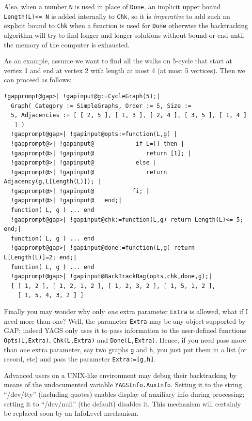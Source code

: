\documentclass[a4paper,11pt]{report}
\begin{document}
{{Also, when a number \texttt{N} is used in place of \texttt{Done}, an implicit upper bound \texttt{Length(L){\textless}= N} is added internally to \texttt{Chk}, so it is \emph{imperative} to add such an explicit bound to \texttt{Chk} when a function is used for \texttt{Done} otherwise the backtracking algorithm will try to find longer and longer
solutions without bound or end until the memory of the computer is exhausted. 

As an example, assume we want to find all the walks on 5-cycle that start at
vertex 1 and end at vertex 2 with length at most 4 (at most 5 vertices). Then
we can proceed as follows: 

 
\begin{Verbatim}[commandchars=!@|,fontsize=\small,frame=single,label=Example]
  !gapprompt@gap>| !gapinput@g:=CycleGraph(5);|
  Graph( Category := SimpleGraphs, Order := 5, Size := 
  5, Adjacencies := [ [ 2, 5 ], [ 1, 3 ], [ 2, 4 ], [ 3, 5 ], [ 1, 4 ] 
   ] )
  !gapprompt@gap>| !gapinput@opts:=function(L,g) |
  !gapprompt@>| !gapinput@            if L=[] then |
  !gapprompt@>| !gapinput@               return [1]; |
  !gapprompt@>| !gapinput@            else |
  !gapprompt@>| !gapinput@               return Adjacency(g,L[Length(L)]); |
  !gapprompt@>| !gapinput@           fi; |
  !gapprompt@>| !gapinput@   end;|
  function( L, g ) ... end
  !gapprompt@gap>| !gapinput@chk:=function(L,g) return Length(L)<= 5; end;|
  function( L, g ) ... end
  !gapprompt@gap>| !gapinput@done:=function(L,g) return L[Length(L)]=2; end;|
  function( L, g ) ... end
  !gapprompt@gap>| !gapinput@BackTrackBag(opts,chk,done,g);|
  [ [ 1, 2 ], [ 1, 2, 1, 2 ], [ 1, 2, 3, 2 ], [ 1, 5, 1, 2 ], 
    [ 1, 5, 4, 3, 2 ] ]
\end{Verbatim}
 

Finally you may wonder why only \emph{one} extra parameter \texttt{Extra} is allowed, what if I need more than one? Well, the parameter \texttt{Extra} may be any object supported by \textsf{GAP}; indeed \textsf{YAGS} only uses it to pass information to the user-defined functions \texttt{Opts(L,Extra)}, \texttt{Chk(L,Extra)} and \texttt{Done(L,Extra)}. Hence, if you need pass more than one extra parameter, say two graphs \texttt{g} and \texttt{h}, you just put them in a list (or record, etc) and pass the parameter \texttt{Extra:=[g,h]}. 

Advanced users on a UNIX-like environment may debug their backtracking by
means of the undocumented variable \texttt{YAGSInfo.AuxInfo}. Setting it to the string ``/dev/tty'' (including quotes) enables display of auxiliary info during processing;
setting it to ``/dev/null'' (the default) disables it. This mechanism will certainly be replaced soon by
an InfoLevel mechanism. }

 }
\end{document}
